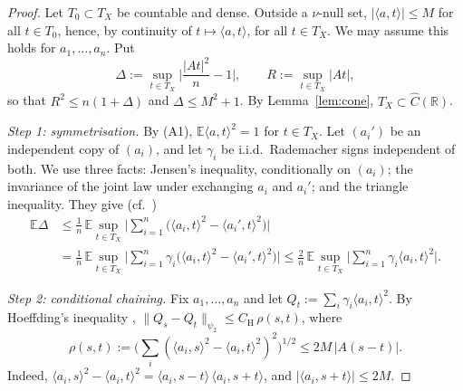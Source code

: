 \documentclass[11pt]{article}
\theoremstyle{definition}
\numberwithin{equation}{section}
\newcommand{\R}{\mathbb{R}}
\newcommand{\E}{\mathbb{E}}
\newcommand{\Ch}{\widehat{C}}
\newcommand{\psitwo}[1]{\lVert #1\rVert_{\psi_2}}
\newcommand{\CH}{C_{\mathrm{H}}}
\begin{document}
\begin{proof}
Let $T_0\subset T_X$ be countable and dense. Outside a $\nu$-null set, $|\langle a,t\rangle|\le M$ for all $t\in T_0$, hence, by continuity of $t\mapsto\langle a,t\rangle$, for all $t\in T_X$. We may assume this holds for $a_1,\dots,a_n$. Put
\[
\Delta:=\sup_{t\in T_X}\Big|\frac{|At|^2}{n}-1\Big|,\qquad R:=\sup_{t\in T_X}|At| ,
\]
so that $R^2\le n(1+\Delta)$ and $\Delta\le M^2+1$. By Lemma~\ref{lem:cone}, $T_X\subset\Ch(\R)$.

\emph{Step 1: symmetrisation.} By (A1), $\E\langle a,t\rangle^2=1$ for $t\in T_X$. Let $(a_i')$ be an independent copy of $(a_i)$, and let $\gamma_i$ be i.i.d.\ Rademacher signs independent of both. We use three facts: Jensen's inequality, conditionally on $(a_i)$; the invariance of the joint law under exchanging $a_i$ and $a_i'$; and the triangle inequality. They give (cf.\ \cite[Exercise~6.4.4]{Vershynin})
\begin{align*}
\E\Delta&\le\frac1n\,\E\sup_{t\in T_X}\Big|\sum_{i=1}^n\big(\langle a_i,t\rangle^2-\langle a_i',t\rangle^2\big)\Big|\\
&=\frac1n\,\E\sup_{t\in T_X}\Big|\sum_{i=1}^n\gamma_i\big(\langle a_i,t\rangle^2-\langle a_i',t\rangle^2\big)\Big|
\le\frac2n\,\E\sup_{t\in T_X}\Big|\sum_{i=1}^n\gamma_i\langle a_i,t\rangle^2\Big| .
\end{align*}

\emph{Step 2: conditional chaining.} Fix $a_1,\dots,a_n$ and let $Q_t:=\sum_i\gamma_i\langle a_i,t\rangle^2$. By Hoeffding's inequality \cite[Prop.~2.6.1]{Vershynin}, $\psitwo{Q_s-Q_t}\le\CH\,\rho(s,t)$, where
\[
\rho(s,t):=\Big(\sum_i(\langle a_i,s\rangle^2-\langle a_i,t\rangle^2)^2\Big)^{1/2}\le2M\,|A(s-t)| .
\]
Indeed, $\langle a_i,s\rangle^2-\langle a_i,t\rangle^2=\langle a_i,s-t\rangle\,\langle a_i,s+t\rangle$, and $|\langle a_i,s+t\rangle|\le2M$.


\end{proof}
\end{document}
